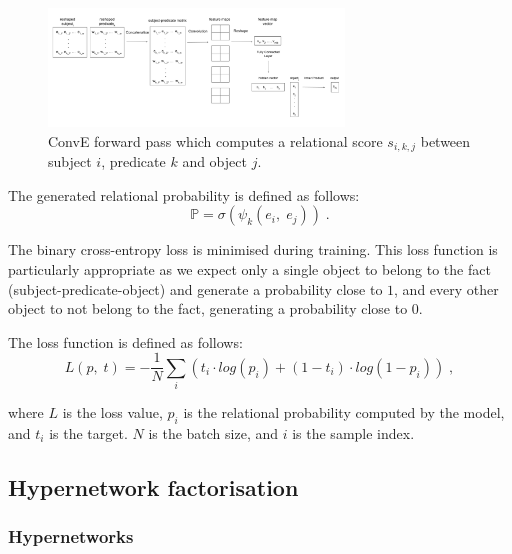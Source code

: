\begin{figure}
   	\centering
    	\includegraphics[width=0.7\textwidth, height=0.4\textwidth]{convolutional_entity_representations_final}
	\captionsetup{justification=centering}
	\caption{ConvE forward pass which computes a relational score $ s_{i,k,j} $ between subject $ i $, predicate $ k $ and object $ j $.}
\end{figure}

\noindent The generated relational probability is defined as follows: 
\begin{equation}
	\mathbb{P} = \sigma(\psi_k(e_i, \; e_j)) \; .
\end{equation}

\noindent The binary cross-entropy loss is minimised during training. This loss function is particularly appropriate as we expect only a single object to belong to the fact (subject-predicate-object) and generate a probability close to $ 1 $, and every other object to not belong to the fact, generating a probability close to $ 0 $. \par

\noindent The loss function is defined as follows:
\begin{equation}
	L(p, \; t) =  -\frac{1}{N}\sum_i(t_i \cdot log(p_i) + (1 - t_i) \cdot log(1 - p_i)) \; ,
\end{equation}

\noindent where $ L $ is the loss value, $ p_i $ is the relational probability computed by the model, and $ t_i $ is the target. $ N $ is the batch size, and $ i $ is the sample index.



\subsection{Hypernetwork factorisation}

\subsubsection{Hypernetworks}

